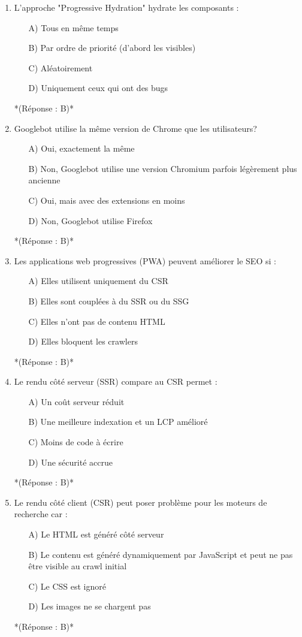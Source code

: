 \documentclass[12pt,a4paper,twoside]{report}
\begin{document}
\begin{enumerate}
\item L'approche "Progressive Hydration" hydrate les composants :
\begin{itemize}
\item[A)] Tous en même temps
\item[B)] Par ordre de priorité (d'abord les visibles)
\item[C)] Aléatoirement
\item[D)] Uniquement ceux qui ont des bugs
\end{itemize}
*(Réponse : B)*

\item Googlebot utilise la même version de Chrome que les utilisateurs?
\begin{itemize}
\item[A)] Oui, exactement la même
\item[B)] Non, Googlebot utilise une version Chromium parfois légèrement plus ancienne
\item[C)] Oui, mais avec des extensions en moins
\item[D)] Non, Googlebot utilise Firefox
\end{itemize}
*(Réponse : B)*

\item Les applications web progressives (PWA) peuvent améliorer le SEO si :
\begin{itemize}
\item[A)] Elles utilisent uniquement du CSR
\item[B)] Elles sont couplées à du SSR ou du SSG
\item[C)] Elles n'ont pas de contenu HTML
\item[D)] Elles bloquent les crawlers
\end{itemize}
*(Réponse : B)*

\item Le rendu côté serveur (SSR) compare au CSR permet :
\begin{itemize}
\item[A)] Un coût serveur réduit
\item[B)] Une meilleure indexation et un LCP amélioré
\item[C)] Moins de code à écrire
\item[D)] Une sécurité accrue
\end{itemize}
*(Réponse : B)*

\item Le rendu côté client (CSR) peut poser problème pour les moteurs de recherche car :
\begin{itemize}
\item[A)] Le HTML est généré côté serveur
\item[B)] Le contenu est généré dynamiquement par JavaScript et peut ne pas être visible au crawl initial
\item[C)] Le CSS est ignoré
\item[D)] Les images ne se chargent pas
\end{itemize}
*(Réponse : B)*
\end{enumerate}
\end{document}
